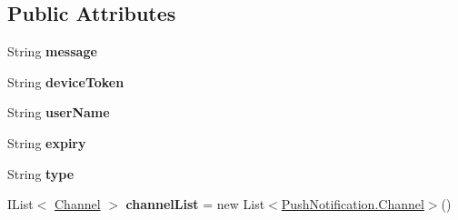 \subsection*{Public Attributes}
\begin{DoxyCompactItemize}
\item 
\hypertarget{classcom_1_1shephertz_1_1app42_1_1paas_1_1sdk_1_1windows_1_1push_1_1_push_notification_a9ec45ae9bbfd2a4c536d73445892a329}{String {\bfseries message}}\label{classcom_1_1shephertz_1_1app42_1_1paas_1_1sdk_1_1windows_1_1push_1_1_push_notification_a9ec45ae9bbfd2a4c536d73445892a329}

\item 
\hypertarget{classcom_1_1shephertz_1_1app42_1_1paas_1_1sdk_1_1windows_1_1push_1_1_push_notification_a524b9863ef242eb19d89eef4dbe82d5b}{String {\bfseries device\+Token}}\label{classcom_1_1shephertz_1_1app42_1_1paas_1_1sdk_1_1windows_1_1push_1_1_push_notification_a524b9863ef242eb19d89eef4dbe82d5b}

\item 
\hypertarget{classcom_1_1shephertz_1_1app42_1_1paas_1_1sdk_1_1windows_1_1push_1_1_push_notification_a9f641b7a6d5f0d5c82a90b4de927ecc8}{String {\bfseries user\+Name}}\label{classcom_1_1shephertz_1_1app42_1_1paas_1_1sdk_1_1windows_1_1push_1_1_push_notification_a9f641b7a6d5f0d5c82a90b4de927ecc8}

\item 
\hypertarget{classcom_1_1shephertz_1_1app42_1_1paas_1_1sdk_1_1windows_1_1push_1_1_push_notification_a522754ccd2e87aebebca39c232a2447a}{String {\bfseries expiry}}\label{classcom_1_1shephertz_1_1app42_1_1paas_1_1sdk_1_1windows_1_1push_1_1_push_notification_a522754ccd2e87aebebca39c232a2447a}

\item 
\hypertarget{classcom_1_1shephertz_1_1app42_1_1paas_1_1sdk_1_1windows_1_1push_1_1_push_notification_a526ea5dbe2e78568c687642dc5d1705d}{String {\bfseries type}}\label{classcom_1_1shephertz_1_1app42_1_1paas_1_1sdk_1_1windows_1_1push_1_1_push_notification_a526ea5dbe2e78568c687642dc5d1705d}

\item 
\hypertarget{classcom_1_1shephertz_1_1app42_1_1paas_1_1sdk_1_1windows_1_1push_1_1_push_notification_afad2886f8c3677a3cbd5a9b71feb64a6}{I\+List$<$ \hyperlink{classcom_1_1shephertz_1_1app42_1_1paas_1_1sdk_1_1windows_1_1push_1_1_push_notification_1_1_channel}{Channel} $>$ {\bfseries channel\+List} = new List$<$\hyperlink{classcom_1_1shephertz_1_1app42_1_1paas_1_1sdk_1_1windows_1_1push_1_1_push_notification_1_1_channel}{Push\+Notification.\+Channel}$>$()}\label{classcom_1_1shephertz_1_1app42_1_1paas_1_1sdk_1_1windows_1_1push_1_1_push_notification_afad2886f8c3677a3cbd5a9b71feb64a6}

\end{DoxyCompactItemize}
